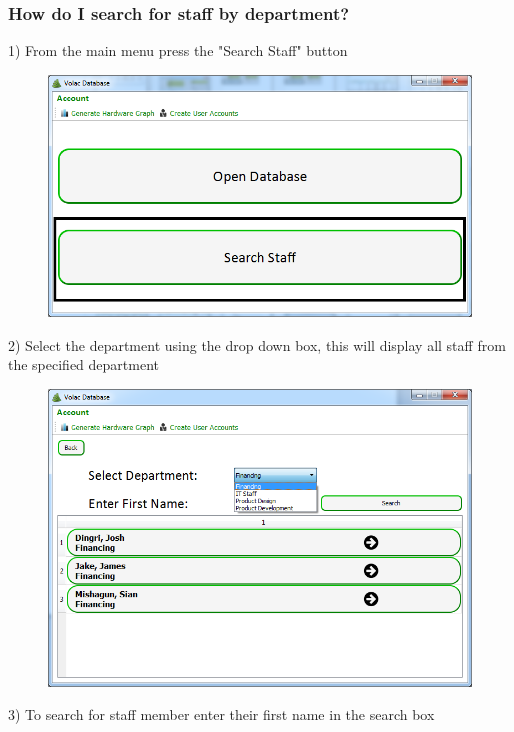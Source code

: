 \subsubsection{How do I search for staff by department?}\label{departsearch}

1) From the main menu press the "Search Staff" button

\begin{figure}[H]
    \includegraphics[width=\textwidth]{./Manual/Images/searchdep.png}
\end{figure}

2) Select the department using the drop down box, this will display all staff from the specified department

\begin{figure}[H]
    \includegraphics[width=\textwidth]{./Manual/Images/searchdep2.png}
\end{figure}

3) To search for staff member enter their first name in the search box

